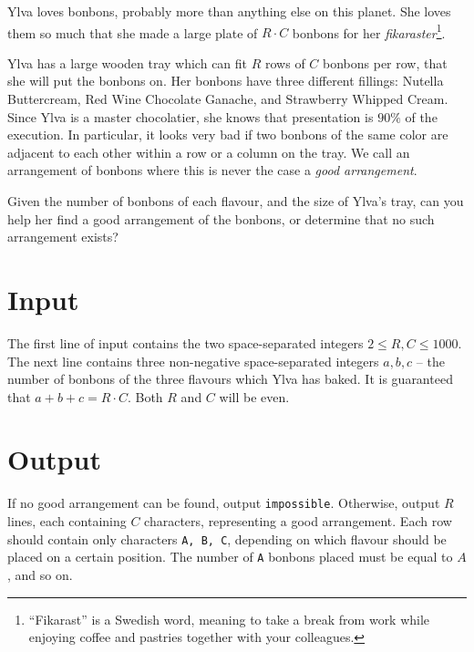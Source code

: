 Ylva loves bonbons, probably more than anything else on this planet.
She loves them so much that she made a large plate of $R \cdot C$ bonbons for her \emph{fikaraster}\footnote{``Fikarast'' is a Swedish word, meaning to take a break from work while enjoying coffee and pastries together with your colleagues.}.

Ylva has a large wooden tray which can fit $R$ rows of $C$ bonbons per row, that she will put the bonbons on.
Her bonbons have three different fillings: Nutella Buttercream, Red Wine Chocolate Ganache, and Strawberry Whipped Cream.
Since Ylva is a master chocolatier, she knows that presentation is $90\%$ of the execution.
In particular, it looks very bad if two bonbons of the same color are adjacent to each other within a row or a column on the tray.
We call an arrangement of bonbons where this is never the case a \emph{good arrangement}.

Given the number of bonbons of each flavour, and the size of Ylva's tray, can you help her find a good arrangement of the bonbons, or determine that no such arrangement exists?

\section*{Input}
The first line of input contains the two space-separated integers $2 \le R, C \le 1000$.
The next line contains three non-negative space-separated integers $a, b, c$ -- the number of bonbons of the three flavours which Ylva has baked.
It is guaranteed that $a + b + c = R \cdot C$.
Both $R$ and $C$ will be even.

\section*{Output}
If no good arrangement can be found, output \texttt{impossible}.
Otherwise, output $R$ lines, each containing $C$ characters, representing a good arrangement.
Each row should contain only characters \texttt{A, B, C}, depending on which flavour should be placed on a certain position.
The number of \texttt{A} bonbons placed must be equal to $A$, and so on.
